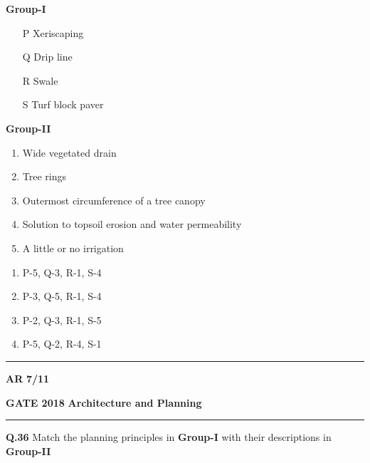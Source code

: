 \documentclass[journal,12pt,onecolumn]{IEEEtran}
\theoremstyle{remark}
\begin{document}
\begin{multicols}{2}
\noindent \hspace{1.5cm} \textbf{Group-I}
\begin{enumerate}[label=(\Alph*),leftmargin=1.5cm ]
    \item[P] Xeriscaping
    \item[Q] Drip line
    \item[R] Swale
    \item[S] Turf block paver
\end{enumerate}

\columnbreak

\noindent \hspace{1cm} \textbf{Group-II}
\begin{enumerate}[label=(\arabic*) , leftmargin=1.5cm] 
    \item Wide vegetated drain
    \item Tree rings
    \item Outermost circumference of a tree canopy
    \item Solution to topsoil erosion and water permeability
    \item A little or no irrigation
\end{enumerate}
\end{multicols}

\vspace{0.3cm}

\begin{multicols}{2}
\begin{enumerate}[ label=(\Alph*) , leftmargin=1.5cm ]
    \item P-5, Q-3, R-1, S-4
    \item P-3, Q-5, R-1, S-4
    \item P-2, Q-3, R-1, S-5
    \item P-5, Q-2, R-4, S-1
\end{enumerate}
\end{multicols}


 \noindent
\hrule \vspace{0.0875CM} \textbf{AR} \hfill  \textbf{7/11}

\newpage
\noindent
\textbf{GATE 2018} \hfill \textbf{Architecture and Planning}
\vspace{0.0012cm} \hrule

\noindent\textbf{Q.36} Match the planning principles in \textbf{Group-I} with their descriptions in \textbf{Group-II}
\end{document}
